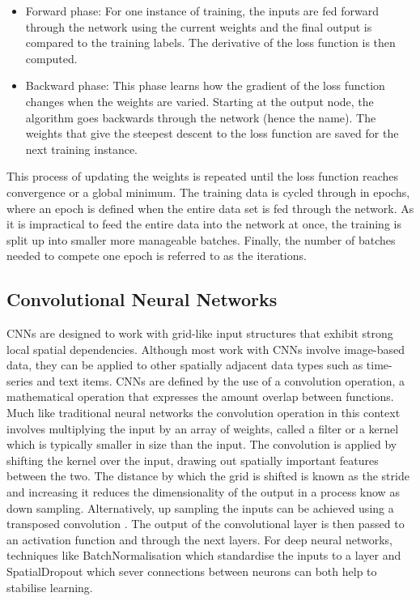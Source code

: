 \documentclass[12pt]{iopart}
\begin{document}
\begin{itemize}
\item Forward phase: For one instance of training, the inputs are fed forward through the network using the current weights and the final output is compared to the training labels. The derivative of the loss function is then computed.
\item Backward phase: This phase learns how the gradient of the loss function changes when the weights are varied. Starting at the output node, the algorithm goes backwards through the network (hence the name). The weights that give the steepest descent to the loss function are saved for the next training instance.  
\end{itemize}
This process of updating the weights is repeated until the loss function reaches convergence or a global minimum. The training data is cycled through in epochs, where an epoch is defined when the entire data set is fed through the network. As it is impractical to feed the entire data into the network at once, the training is split up into smaller more manageable batches. Finally, the number of batches needed to compete one epoch is referred to as the iterations.


\subsection{Convolutional Neural Networks}
%
\acp{CNN} are designed to work with grid-like input structures that exhibit
strong local spatial dependencies. Although most work with \acp{CNN}
involve image-based data, they can be applied to other spatially adjacent data
types such as time-series and text items. \acp{CNN} are defined by the use of a
convolution operation, a mathematical operation that expresses the amount
overlap between functions. Much like traditional neural networks the convolution operation in this context involves multiplying the input by an array of weights, called a filter or a kernel which is typically smaller in size than the input. The convolution is applied by shifting the kernel over the input, drawing out spatially important features between the
two. The distance by which the grid is shifted is known as
the stride and increasing it reduces the dimensionality of the
output in a process know as down sampling. Alternatively, up sampling the inputs can be achieved using a transposed convolution \cite{dumoulin2016guide}.   The output of the convolutional layer is then passed to an activation function and through the next layers. For deep neural networks, techniques like BatchNormalisation \cite{ioffe2015batch} which standardise the inputs to a layer and SpatialDropout \cite{tompson2014efficient} which sever connections between neurons can both help to stabilise learning.  
\end{document}

